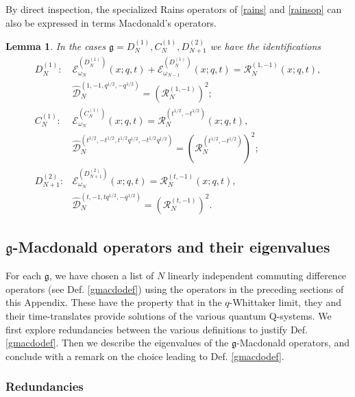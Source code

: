 \documentclass[12pt]{amsart}
\newtheorem{lemma}[thm]{Lemma}
\newcommand{\g}{{\mathfrak{g}}}
\numberwithin{equation}{section}
\begin{document}
By direct inspection, the specialized Rains operators of \eqref{rains} and \eqref{rainsop} can also be expressed in terms Macdonald's operators.
\begin{lemma}\label{lesautres}
In the cases $\g=D_{N}^{(1)}, C_N^{(1)}, D_{N+1}^{(2)}$ we have the identifications
\begin{equation}
\renewcommand{\arraystretch}{1.5}
\begin{array}{ll}
D_{N}^{(1)}:&{\mathcal E}_{\omega_N}^{(D_N^{(1)})}(x;q,t) +{\mathcal E}_{\omega_{N-1}}^{(D_N^{(1)})}(x;q,t)= {\mathcal R}_N^{(1,-1)}(x;q,t),\\ &
 \widehat{\mathcal D}_N^{(1,-1,q^{1/2},-q^{1/2})}=\left({\mathcal R}_N^{(1,-1)}\right)^2;\\
C_N^{(1)}:&{\mathcal E}_{\omega_N}^{(C_N^{(1)})}(x;q,t)={\mathcal R}_N^{(t^{1/2},-t^{1/2})}(x;q,t),\\
&\widehat{\mathcal D}_N^{(t^{1/2},-t^{1/2},t^{1/2}q^{1/2},-t^{1/2}q^{1/2})}=\left({\mathcal R}_N^{(t^{1/2},-t^{1/2})}\right)^2;\\
%
D_{N+1}^{(2)}:&{\mathcal E}_{\omega_N}^{(D_{N+1}^{(2)})}(x;q,t)={\mathcal R}_N^{(t,-1)}(x;q,t),\\ 
&\widehat{\mathcal D}_N^{(t,-1,t q^{1/2},-q^{1/2})}=\left({\mathcal R}_N^{(t,-1)}\right)^2.
\end{array}
\end{equation}
\end{lemma}



\subsection{$\g$-Macdonald operators and their eigenvalues}
\label{gmacsec}

For each $\g$, we have chosen a list of $N$ linearly independent commuting difference operators (see Def. \ref{gmacdodef}) using the operators in the preceding sections of this Appendix. These have the property that in the $q$-Whittaker limit, they and their time-translates provide solutions of the various quantum Q-systems.
%
%
%
%
We first explore redundancies between the various definitions to justify Def. \ref{gmacdodef}. Then we describe the eigenvalues of the $\g$-Macdonald operators, and conclude with a remark on the choice leading to Def. \ref{gmacdodef}.

\subsubsection{Redundancies}
\end{document}
